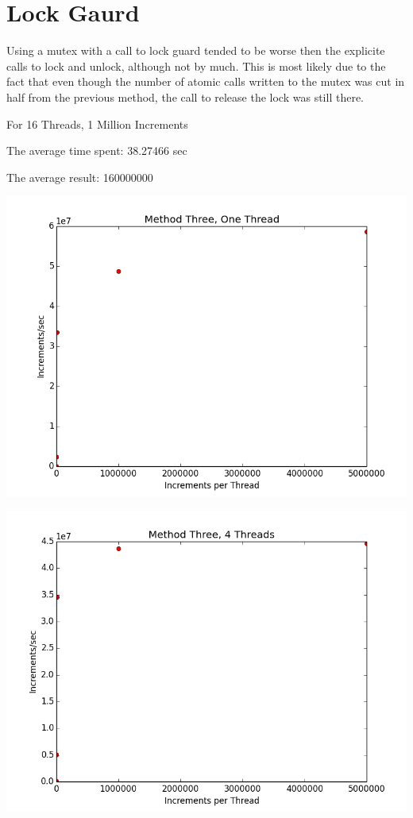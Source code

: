 \documentclass[12pt]{article}
\begin{document}
\section*{Lock Gaurd}
Using a mutex with a call to lock guard tended to be
worse then the explicite calls to lock and unlock,
although not by much. This is most likely due to the fact that
even though the number of atomic calls written to the mutex
was cut in half from the previous method, the call to release
the lock was still there.

For 16 Threads, 1 Million Increments

The average time spent: 38.27466 sec

The average result: 160000000


\includegraphics[scale=.5]{Graphs/MethodThree_1Thread.png}

\includegraphics[scale=.5]{Graphs/MethodThree_4Thread.png}
\end{document}
